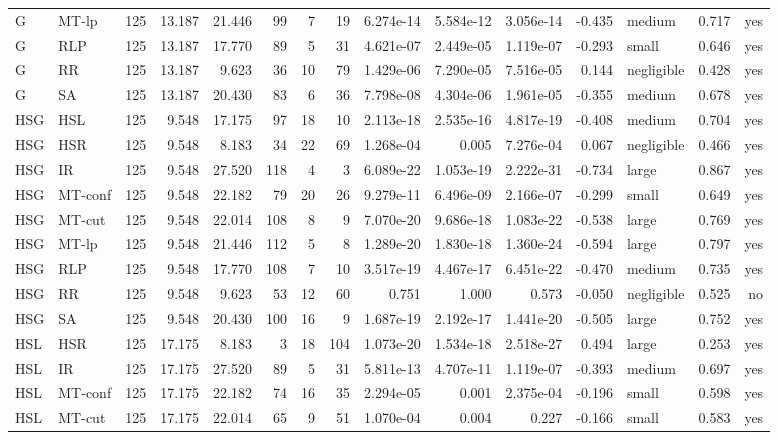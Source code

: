 \begin{table}[htbp]
\begin{tabular}{llrrrrrrrrrrlrr}
G & MT-lp & 125 & 13.187 & 21.446 & 99 & 7 & 19 & 6.274e-14 & 5.584e-12 & 3.056e-14 & -0.435 & medium & 0.717 & yes \\
G & RLP & 125 & 13.187 & 17.770 & 89 & 5 & 31 & 4.621e-07 & 2.449e-05 & 1.119e-07 & -0.293 & small & 0.646 & yes \\
G & RR & 125 & 13.187 & 9.623 & 36 & 10 & 79 & 1.429e-06 & 7.290e-05 & 7.516e-05 & 0.144 & negligible & 0.428 & yes \\
G & SA & 125 & 13.187 & 20.430 & 83 & 6 & 36 & 7.798e-08 & 4.304e-06 & 1.961e-05 & -0.355 & medium & 0.678 & yes \\
HSG & HSL & 125 & 9.548 & 17.175 & 97 & 18 & 10 & 2.113e-18 & 2.535e-16 & 4.817e-19 & -0.408 & medium & 0.704 & yes \\
HSG & HSR & 125 & 9.548 & 8.183 & 34 & 22 & 69 & 1.268e-04 & 0.005 & 7.276e-04 & 0.067 & negligible & 0.466 & yes \\
HSG & IR & 125 & 9.548 & 27.520 & 118 & 4 & 3 & 6.089e-22 & 1.053e-19 & 2.222e-31 & -0.734 & large & 0.867 & yes \\
HSG & MT-conf & 125 & 9.548 & 22.182 & 79 & 20 & 26 & 9.279e-11 & 6.496e-09 & 2.166e-07 & -0.299 & small & 0.649 & yes \\
HSG & MT-cut & 125 & 9.548 & 22.014 & 108 & 8 & 9 & 7.070e-20 & 9.686e-18 & 1.083e-22 & -0.538 & large & 0.769 & yes \\
HSG & MT-lp & 125 & 9.548 & 21.446 & 112 & 5 & 8 & 1.289e-20 & 1.830e-18 & 1.360e-24 & -0.594 & large & 0.797 & yes \\
HSG & RLP & 125 & 9.548 & 17.770 & 108 & 7 & 10 & 3.517e-19 & 4.467e-17 & 6.451e-22 & -0.470 & medium & 0.735 & yes \\
HSG & RR & 125 & 9.548 & 9.623 & 53 & 12 & 60 & 0.751 & 1.000 & 0.573 & -0.050 & negligible & 0.525 & no \\
HSG & SA & 125 & 9.548 & 20.430 & 100 & 16 & 9 & 1.687e-19 & 2.192e-17 & 1.441e-20 & -0.505 & large & 0.752 & yes \\
HSL & HSR & 125 & 17.175 & 8.183 & 3 & 18 & 104 & 1.073e-20 & 1.534e-18 & 2.518e-27 & 0.494 & large & 0.253 & yes \\
HSL & IR & 125 & 17.175 & 27.520 & 89 & 5 & 31 & 5.811e-13 & 4.707e-11 & 1.119e-07 & -0.393 & medium & 0.697 & yes \\
HSL & MT-conf & 125 & 17.175 & 22.182 & 74 & 16 & 35 & 2.294e-05 & 0.001 & 2.375e-04 & -0.196 & small & 0.598 & yes \\
HSL & MT-cut & 125 & 17.175 & 22.014 & 65 & 9 & 51 & 1.070e-04 & 0.004 & 0.227 & -0.166 & small & 0.583 & yes \\

\end{tabular}
\end{table}
